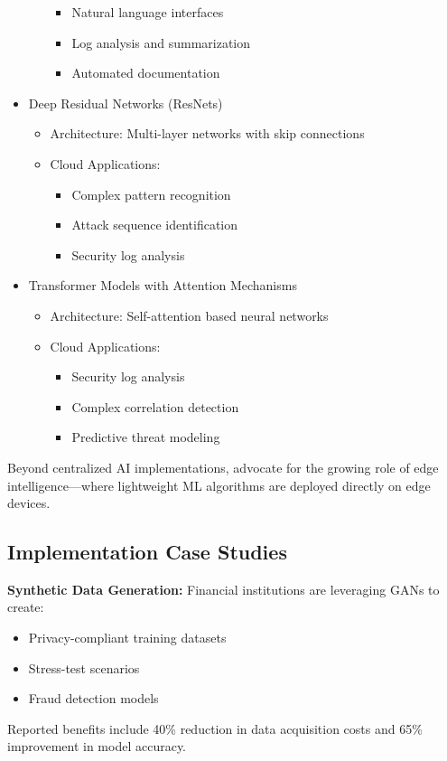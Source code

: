 \documentclass[a4paper,12pt]{article}
\begin{document}
\begin{itemize}
\begin{itemize}
\begin{itemize}
                        \item Natural language interfaces
                        \item Log analysis and summarization
                        \item Automated documentation
                    \end{itemize}
          \end{itemize}
    \item Deep Residual Networks (ResNets)
          \begin{itemize}
              \item Architecture: Multi-layer networks with skip connections
              \item Cloud Applications:
                    \begin{itemize}
                        \item Complex pattern recognition
                        \item Attack sequence identification
                        \item Security log analysis
                    \end{itemize}
          \end{itemize}
    \item Transformer Models with Attention Mechanisms
          \begin{itemize}
              \item Architecture: Self-attention based neural networks
              \item Cloud Applications:
                    \begin{itemize}
                        \item Security log analysis
                        \item Complex correlation detection
                        \item Predictive threat modeling
                    \end{itemize}
          \end{itemize}
\end{itemize}

Beyond centralized AI implementations, \citet{hoffpauir2023survey} advocate for the growing role of edge intelligence—where lightweight ML algorithms are deployed directly on edge devices.

\subsection{Implementation Case Studies}
\textbf{Synthetic Data Generation:} Financial institutions are leveraging GANs to create:
\begin{itemize}
    \item Privacy-compliant training datasets
    \item Stress-test scenarios
    \item Fraud detection models
\end{itemize}
Reported benefits include 40\% reduction in data acquisition costs and 65\% improvement in model accuracy.
\end{document}
